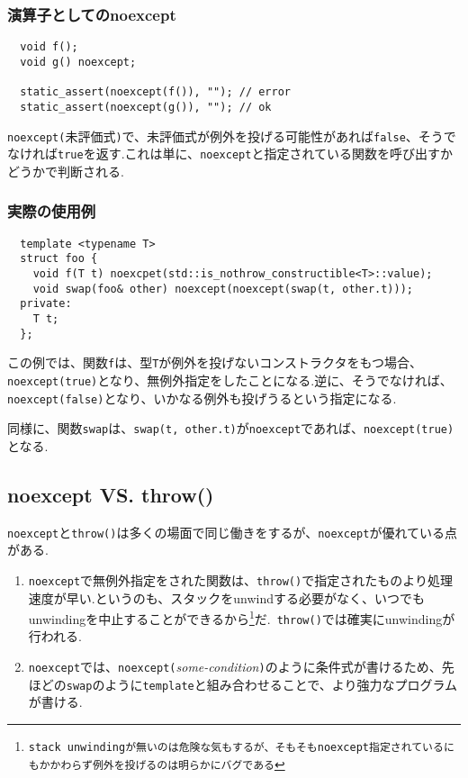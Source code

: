\documentclass[a4j,11pt,openright]{jsbook}
\begin{document}
\subsubsection{演算子としてのnoexcept}

\begin{verbatim}
  void f();
  void g() noexcept;

  static_assert(noexcept(f()), ""); // error
  static_assert(noexcept(g()), ""); // ok
\end{verbatim}

\verb|noexcept(|未評価式\verb|)|で、未評価式が例外を投げる可能性があれば\verb|false|、そうでなければ\verb|true|を返す.これは単に、\verb|noexcept|と指定されている関数を呼び出すかどうかで判断される.

\subsubsection{実際の使用例}

\begin{verbatim}
  template <typename T>
  struct foo {
    void f(T t) noexcpet(std::is_nothrow_constructible<T>::value);
    void swap(foo& other) noexcept(noexcept(swap(t, other.t)));
  private:
    T t;
  };
\end{verbatim}

この例では、関数\verb|f|は、型\verb|T|が例外を投げないコンストラクタをもつ場合、\verb|noexcept(true)|となり、無例外指定をしたことになる.逆に、そうでなければ、\verb|noexcept(false)|となり、いかなる例外も投げうるという指定になる.

同様に、関数\verb|swap|は、\verb|swap(t, other.t)|が\verb|noexcept|であれば、\verb|noexcept(true)|となる.

\subsection{noexcept VS. throw()}

\verb|noexcept|と\verb|throw()|は多くの場面で同じ働きをするが、\verb|noexcept|が優れている点がある.

\begin{enumerate}
  \item \verb|noexcept|で無例外指定をされた関数は、\verb|throw()|で指定されたものより処理速度が早い.というのも、スタックをunwindする必要がなく、いつでもunwindingを中止することができるから\footnote{\texttt{stack unwindingが無いのは危険な気もするが、そもそもnoexcept指定されているにもかかわらず例外を投げるのは明らかにバグである}}だ.\ \verb|throw()|では確実にunwindingが行われる.
  \item \verb|noexcept|では、\verb|noexcept(|\textit{some-condition}\verb|)|のように条件式が書けるため、先ほどの\verb|swap|のように\verb|template|と組み合わせることで、より強力なプログラムが書ける.
\end{enumerate}
\end{document}
